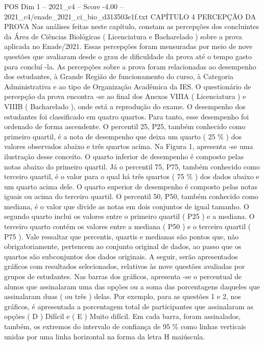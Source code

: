 \begin{textsample}{POS Dim 1 – 2021\_c4 – Score -4.00 – 2021\_c4/enade\_2021\_ci\_bio\_d313503e1f.txt}  \label{ex:f1_pos_377}
CAPÍTULO 4 PERCEPÇÃO DA PROVA Nas análises feitas neste capítulo, constam as percepções dos concluintes da Área de Ciências Biológicas ( Licenciatura e Bacharelado ) sobre a prova aplicada no Enade/2021.
Essas percepções foram mensuradas por meio de nove questões que avaliaram desde o grau de dificuldade da prova até o tempo gasto para concluí -la.
As percepções sobre a prova foram relacionadas ao desempenho dos estudantes, à Grande Região de funcionamento do curso, à Categoria Administrativa e ao tipo de Organização Acadêmica da IES.
O questionário de percepção da prova encontra -se ao final dos Anexos VIIIA ( Licenciatura ) e VIIIB ( Bacharelado ), onde está a reprodução do exame.
O desempenho dos estudantes foi classificado em quatro quartos.
Para tanto, esse desempenho foi ordenado de forma ascendente.
O percentil 25, P25, também conhecido como primeiro quartil, é a nota de desempenho que deixa um quarto ( 25 \% ) dos valores observados abaixo e três quartos acima.
Na Figura 1, apresenta -se uma ilustração desse conceito.
O quarto inferior de desempenho é composto pelas notas abaixo do primeiro quartil.
Já o percentil 75, P75, também conhecido como terceiro quartil, é o valor para o qual há três quartos ( 75 \% ) dos dados abaixo e um quarto acima dele.
O quarto superior de desempenho é composto pelas notas iguais ou acima do terceiro quartil.
O percentil 50, P50, também conhecido como mediana, é o valor que divide as notas em dois conjuntos de igual tamanho.
O segundo quarto inclui os valores entre o primeiro quartil ( P25 ) e a mediana.
O terceiro quarto contém os valores entre a mediana ( P50 ) e o terceiro quartil ( P75 ).
Vale ressaltar que percentis, quartis e medianas são pontos que, não obrigatoriamente, pertencem ao conjunto original de dados, ao passo que os quartos são subconjuntos dos dados originais.
A seguir, serão apresentados gráficos com resultados selecionados, relativos às nove questões avaliadas por grupos de estudantes.
Nas barras dos gráficos, apresenta -se o percentual de alunos que assinalaram uma das opções ou a soma das porcentagens daqueles que assinalaram duas ( ou três ) delas.
Por exemplo, para as questões 1 e 2, nos gráficos, é apresentada a porcentagem total de participantes que assinalaram as opções ( D ) Difícil e ( E ) Muito difícil.
Em cada barra, foram assinalados, também, os extremos do intervalo de confiança de 95 \% como linhas verticais unidas por uma linha horizontal na forma da letra H maiúscula.

\end{textsample}
